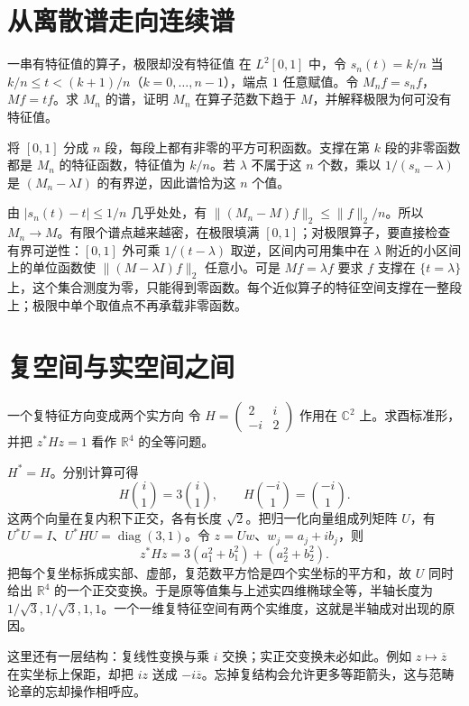 \section{从离散谱走向连续谱}

\begin{example}{一串有特征值的算子，极限却没有特征值}
在 $L^2[0,1]$ 中，令 $s_n(t)=k/n$ 当 $k/n\le t<(k+1)/n$（$k=0,\ldots,n-1$），端点 $1$ 任意赋值。令 $M_nf=s_nf$，$Mf=tf$。求 $M_n$ 的谱，证明 $M_n$ 在算子范数下趋于 $M$，并解释极限为何可没有特征值。
\end{example}
\begin{solution}
将 $[0,1]$ 分成 $n$ 段，每段上都有非零的平方可积函数。支撑在第 $k$ 段的非零函数都是 $M_n$ 的特征函数，特征值为 $k/n$。若 $\lambda$ 不属于这 $n$ 个数，乘以 $1/(s_n-\lambda)$ 是 $(M_n-\lambda I)$ 的有界逆，因此谱恰为这 $n$ 个值。

由 $|s_n(t)-t|\le1/n$ 几乎处处，有 $\|(M_n-M)f\|_2\le \|f\|_2/n$。所以 $M_n\to M$。有限个谱点越来越密，在极限填满 $[0,1]$；对极限算子，要直接检查有界可逆性：$[0,1]$ 外可乘 $1/(t-\lambda)$ 取逆，区间内可用集中在 $\lambda$ 附近的小区间上的单位函数使 $\|(M-\lambda I)f\|_2$ 任意小。可是 $Mf=\lambda f$ 要求 $f$ 支撑在 $\{t=\lambda\}$ 上，这个集合测度为零，只能得到零函数。每个近似算子的特征空间支撑在一整段上；极限中单个取值点不再承载非零函数。
\end{solution}

\section{复空间与实空间之间}

\begin{example}{一个复特征方向变成两个实方向}
令 $H=\begin{pmatrix}2&i\\-i&2\end{pmatrix}$ 作用在 $\mathbb C^2$ 上。求酉标准形，并把 $z^*Hz=1$ 看作 $\mathbb R^4$ 的全等问题。
\end{example}
\begin{solution}
$H^*=H$。分别计算可得
\[
H\binom{i}{1}=3\binom{i}{1},\qquad
H\binom{-i}{1}=\binom{-i}{1}.
\]
这两个向量在复内积下正交，各有长度 $\sqrt2$。把归一化向量组成列矩阵 $U$，有 $U^*U=I$、$U^*HU=\operatorname{diag}(3,1)$。令 $z=Uw$、$w_j=a_j+ib_j$，则
\[
z^*Hz=3(a_1^2+b_1^2)+(a_2^2+b_2^2).
\]
把每个复坐标拆成实部、虚部，复范数平方恰是四个实坐标的平方和，故 $U$ 同时给出 $\mathbb R^4$ 的一个正交变换。于是原等值集与上述实四维椭球全等，半轴长度为 $1/\sqrt3,1/\sqrt3,1,1$。一个一维复特征空间有两个实维度，这就是半轴成对出现的原因。

这里还有一层结构：复线性变换与乘 $i$ 交换；实正交变换未必如此。例如 $z\mapsto\overline z$ 在实坐标上保距，却把 $iz$ 送成 $-i\overline z$。忘掉复结构会允许更多等距箭头，这与范畴论章的忘却操作相呼应。
\end{solution}
